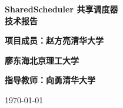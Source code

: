 \begin{titlepage}  
    \vspace*{\fill}
    \begin{center}

        {\huge \bfseries SharedScheduler 共享调度器 \\[1cm] 技术报告}
 
        \vspace{6cm}%

        
        {\large \bf 项目成员：赵方亮\quad 清华大学}
        
        {\large \bf \qquad \qquad \qquad \quad 廖东海\quad 北京理工大学}

        {\large \bf 指导教师：向勇\enspace \enspace \quad 清华大学}
        
        \vspace{12cm}

        \today
    \end{center}
\end{titlepage}

